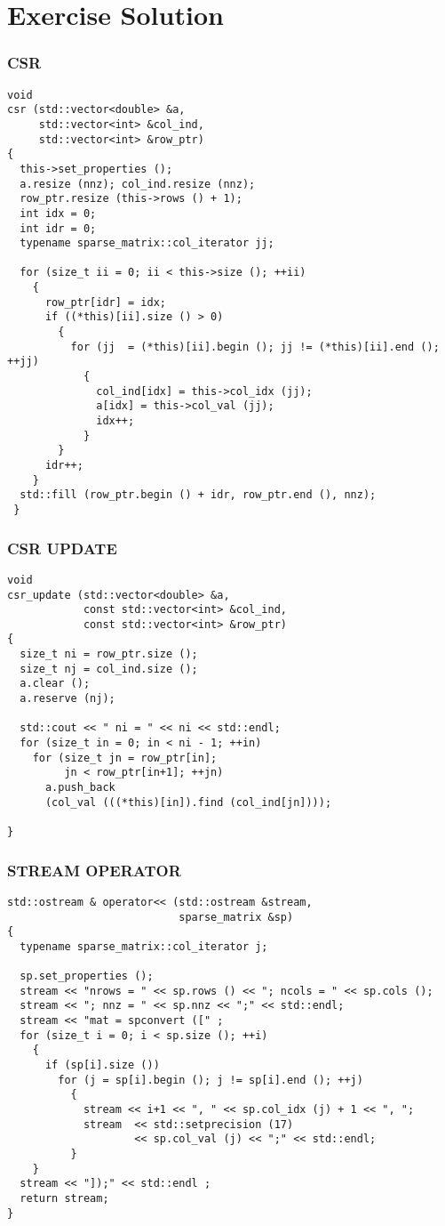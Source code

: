 \documentclass{beamer}
\begin{document}
\section{Exercise Solution}

\begin{frame}[fragile]
\frametitle{CSR}\tiny
\begin{lstlisting}
void
csr (std::vector<double> &a,
     std::vector<int> &col_ind,
     std::vector<int> &row_ptr)
{     
  this->set_properties ();
  a.resize (nnz); col_ind.resize (nnz);
  row_ptr.resize (this->rows () + 1);
  int idx = 0;
  int idr = 0;
  typename sparse_matrix::col_iterator jj;

  for (size_t ii = 0; ii < this->size (); ++ii)
    {
      row_ptr[idr] = idx;
      if ((*this)[ii].size () > 0)
        {
          for (jj  = (*this)[ii].begin (); jj != (*this)[ii].end (); ++jj)
            {
              col_ind[idx] = this->col_idx (jj);
              a[idx] = this->col_val (jj);
              idx++;
            }
        }
      idr++;
    }
  std::fill (row_ptr.begin () + idr, row_ptr.end (), nnz);
 } 
\end{lstlisting}
\end{frame}

\begin{frame}[fragile]
\frametitle{CSR UPDATE}\small
\begin{lstlisting}
void
csr_update (std::vector<double> &a,
            const std::vector<int> &col_ind,
            const std::vector<int> &row_ptr)
{
  size_t ni = row_ptr.size ();
  size_t nj = col_ind.size ();
  a.clear ();
  a.reserve (nj);

  std::cout << " ni = " << ni << std::endl;
  for (size_t in = 0; in < ni - 1; ++in)
    for (size_t jn = row_ptr[in]; 
         jn < row_ptr[in+1]; ++jn)
      a.push_back 
      (col_val (((*this)[in]).find (col_ind[jn])));

}
\end{lstlisting}
\end{frame}

\begin{frame}[fragile]
\frametitle{STREAM OPERATOR}\tiny
\begin{lstlisting}
std::ostream & operator<< (std::ostream &stream,
                           sparse_matrix &sp)
{
  typename sparse_matrix::col_iterator j;

  sp.set_properties ();
  stream << "nrows = " << sp.rows () << "; ncols = " << sp.cols ();
  stream << "; nnz = " << sp.nnz << ";" << std::endl;
  stream << "mat = spconvert ([" ;
  for (size_t i = 0; i < sp.size (); ++i)
    {
      if (sp[i].size ())
        for (j = sp[i].begin (); j != sp[i].end (); ++j)
          {
            stream << i+1 << ", " << sp.col_idx (j) + 1 << ", ";
            stream  << std::setprecision (17)
                    << sp.col_val (j) << ";" << std::endl;
          }
    }
  stream << "]);" << std::endl ;
  return stream;
}
\end{lstlisting}
\end{frame}
\end{document}
